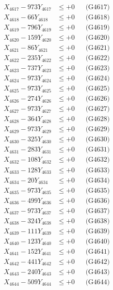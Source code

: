 \documentclass[a4paper,10pt]{article}
\begin{document}
{\begin{align}
X_{4617} - 973Y_{4617} &\leq +0 && \text{(G4617)} \\
X_{4618} - 66Y_{4618} &\leq +0 && \text{(G4618)} \\
X_{4619} - 796Y_{4619} &\leq +0 && \text{(G4619)} \\
X_{4620} - 159Y_{4620} &\leq +0 && \text{(G4620)} \\
\allowbreak
X_{4621} - 86Y_{4621} &\leq +0 && \text{(G4621)} \\
X_{4622} - 235Y_{4622} &\leq +0 && \text{(G4622)} \\
X_{4623} - 737Y_{4623} &\leq +0 && \text{(G4623)} \\
X_{4624} - 973Y_{4624} &\leq +0 && \text{(G4624)} \\
X_{4625} - 973Y_{4625} &\leq +0 && \text{(G4625)} \\
X_{4626} - 274Y_{4626} &\leq +0 && \text{(G4626)} \\
X_{4627} - 973Y_{4627} &\leq +0 && \text{(G4627)} \\
X_{4628} - 364Y_{4628} &\leq +0 && \text{(G4628)} \\
X_{4629} - 973Y_{4629} &\leq +0 && \text{(G4629)} \\
X_{4630} - 325Y_{4630} &\leq +0 && \text{(G4630)} \\
\allowbreak
X_{4631} - 283Y_{4631} &\leq +0 && \text{(G4631)} \\
X_{4632} - 108Y_{4632} &\leq +0 && \text{(G4632)} \\
X_{4633} - 128Y_{4633} &\leq +0 && \text{(G4633)} \\
X_{4634} - 20Y_{4634} &\leq +0 && \text{(G4634)} \\
X_{4635} - 973Y_{4635} &\leq +0 && \text{(G4635)} \\
X_{4636} - 499Y_{4636} &\leq +0 && \text{(G4636)} \\
X_{4637} - 973Y_{4637} &\leq +0 && \text{(G4637)} \\
X_{4638} - 324Y_{4638} &\leq +0 && \text{(G4638)} \\
X_{4639} - 111Y_{4639} &\leq +0 && \text{(G4639)} \\
X_{4640} - 123Y_{4640} &\leq +0 && \text{(G4640)} \\
\allowbreak
X_{4641} - 152Y_{4641} &\leq +0 && \text{(G4641)} \\
X_{4642} - 441Y_{4642} &\leq +0 && \text{(G4642)} \\
X_{4643} - 240Y_{4643} &\leq +0 && \text{(G4643)} \\
X_{4644} - 509Y_{4644} &\leq +0 && \text{(G4644)} \\

\end{align}}
\end{document}
